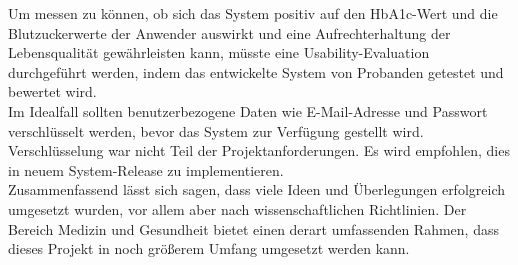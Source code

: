	Um messen zu können, ob sich das System positiv auf den HbA1c-Wert und die Blutzuckerwerte der Anwender auswirkt und eine Aufrechterhaltung der Lebensqualität gewährleisten kann, müsste eine Usability-Evaluation durchgeführt werden, indem das entwickelte System von Probanden getestet und bewertet wird. \\
	Im Idealfall sollten benutzerbezogene Daten wie E-Mail-Adresse und Passwort verschlüsselt werden, bevor das System zur Verfügung gestellt wird. Verschlüsselung war nicht Teil der Projektanforderungen. Es wird empfohlen, dies in neuem System-Release zu implementieren.\\
	Zusammenfassend lässt sich sagen, dass viele Ideen und Überlegungen erfolgreich umgesetzt wurden, vor allem aber nach wissenschaftlichen Richtlinien. Der Bereich Medizin und Gesundheit bietet einen derart umfassenden Rahmen, dass dieses Projekt in noch größerem Umfang umgesetzt werden kann.
